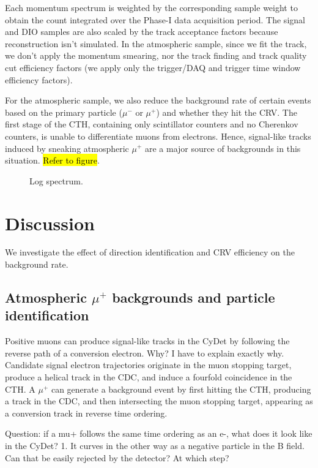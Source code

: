 Each momentum spectrum is weighted by the corresponding sample weight to obtain
the count integrated over the Phase-I data acquisition period. The signal and
DIO samples are also scaled by the track acceptance factors because
reconstruction isn't simulated. In the atmospheric sample, since we fit the
track, we don't apply the momentum smearing, nor the track
finding and track quality cut efficiency factors (we apply only the trigger/DAQ
and trigger time window efficiency factors). 

For the atmospheric sample, we also reduce the background rate of certain events
based on the primary particle ($\mu^-$ or $\mu^+$) and whether they hit the CRV.
The first stage of the CTH, containing only scintillator counters and no
Cherenkov counters, is unable to differentiate muons from electrons. Hence,
signal-like tracks induced by sneaking atmospheric $\mu^+$ are a major source of
backgrounds in this situation. \hl{Refer to figure}.

\begin{figure}
    \centering
    
    \caption{Log spectrum.}
    \label{fig:log_spectrum}
\end{figure}


\section{Discussion}

We investigate the effect of direction identification and CRV efficiency on the
background rate.

\subsection{Atmospheric $\mu^+$ backgrounds and particle identification}
Positive muons can produce signal-like tracks in the CyDet by following the
reverse path of a conversion electron. Why? I have to explain exactly why.
Candidate signal electron trajectories originate in the muon stopping target,
produce a helical track in the CDC, and induce a fourfold coincidence in the
CTH. A $\mu^+$ can generate a background event by first hitting the CTH,
producing a track in the CDC, and then intersecting the muon stopping target,
appearing as a conversion track in reverse time ordering.

Question: if a mu+ follows the same time ordering as an e-, what does it look
like in the CyDet? 1. It curves in the other way as a negative particle in the B
field. Can that be easily rejected by the detector? At which step?

